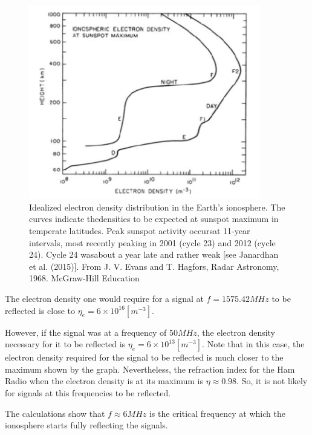 \begin{figure}[H]
	\centering
	\includegraphics[width=0.9\textwidth]{figs/electron_density_iono.png}
	\caption{Idealized electron density distribution in the Earth’s ionosphere.
		The curves indicate thedensities to be expected at sunspot maximum in temperate
		latitudes. Peak sunspot activity occursat 11-year intervals, most recently
		peaking in 2001 (cycle 23) and 2012 (cycle 24). Cycle 24 wasabout a year late
		and rather weak [see Janardhan et al. (2015)]. From J. V. Evans and T. Hagfors,
		Radar Astronomy, 1968. McGraw-Hill Education}
	\label{fig:ex3_electron_density_iono}
\end{figure}

The electron density one would require for a signal at $f = 1575.42 MHz$ to be
reflected is close to $\eta_e = 6 \times 10^{16} [m^{-3}]$.

However, if the signal was at a frequency of $50MHz$, the electron density
necessary for it to be reflected is $\eta_e = 6 \times 10^{13} [m^{-3}]$.
Note that in this case, the electron density required for the signal to be
reflected is much closer to the maximum shown by the graph. Nevertheless,
the refraction index for the Ham Radio when the electron density is at its maximum
is $\eta \approx 0.98$. So, it is not likely for signals at this frequencies to
be reflected.

The calculations show that $f \approx 6 MHz$ is the critical frequency at which
the ionosphere starts fully reflecting the signals.
